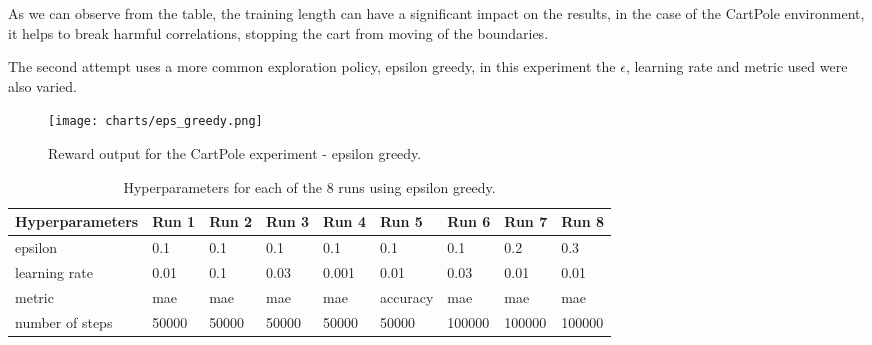 As we can observe from the table, the training length can have a significant impact on the results, 
 in the case of the CartPole environment, it helps to break harmful correlations, stopping the cart from moving of the boundaries. 

 The second attempt uses a more common exploration policy, epsilon greedy, in this experiment the $\epsilon$, learning rate and metric used were also varied.
 \begin{figure}[H]
 \centering
 \texttt{[image: charts/eps\_greedy.png]}
 \caption{Reward output for the CartPole experiment - epsilon greedy.}
 \end{figure}
 
\begin{center}
 \begin{table}[H]
 \caption{Hyperparameters for each of the 8 runs using epsilon greedy.}

 \begin{tabular}{|l|l|l|l|l|l|l|l|l|}
 \hline
 Hyperparameters & Run 1 & Run 2 & Run 3 & Run 4 & Run 5 & Run 6 & Run 7 & Run 8 \\ \hline
 epsilon & 0.1 & 0.1 & 0.1 & 0.1 & 0.1 & 0.1 & 0.2 & 0.3 \\ \hline
 learning rate & 0.01 & 0.1 & 0.03 & 0.001 & 0.01 & 0.03 & 0.01 & 0.01 \\ \hline
 metric & mae & mae & mae & mae & accuracy & mae & mae & mae \\ \hline
 number of steps & 50000 & 50000 & 50000 & 50000 & 50000 & 100000 & 100000& 100000 \\ \hline
 \end{tabular}
 \end{table}
\end{center}
 
